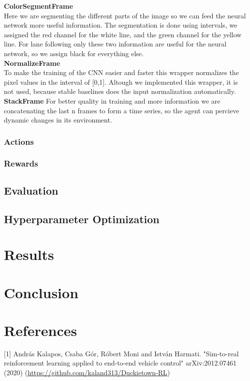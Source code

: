 \documentclass{article}
\begin{document}
\textbullet  \textbf{ColorSegmentFrame}\\
Here we are segmenting the different parts of the image so we can feed the neural network more useful information. The segmentation is done using intervals, we assigned the red channel for the white line, and the green channel for the yellow line. For lane following only these two information are useful for the neural network, so we assign black for everything else.\\
\textbullet  \textbf{NormalizeFrame}\\
To make the training of the CNN easier and faster this wrapper normalizes the pixel values in the interval of [0,1]. Altough we implemented this wrapper, it is not used, because stable baselines does the input normalization automatically.\\
\textbullet  \textbf{StackFrame}
For better quality in training and more information we are concatenating the last n frames to form a time series, so the agent can percieve dynamic changes in its environment.\\

\subsubsection{\normalsize{Actions}}

\subsubsection{\normalsize{Rewards}}

\subsection{\normalsize{Evaluation}}

\subsection{\normalsize{Hyperparameter Optimization}}

\section{\large{Results}}

\section{\large{Conclusion}}

\section*{References}

\small

[1] András Kalapos, Csaba Gór, Róbert Moni and István Harmati. "Sim-to-real reinforcement learning applied to end-to-end vehicle control" arXiv:2012.07461
(2020) (\url{https://github.com/kaland313/Duckietown-RL})
\end{document}
